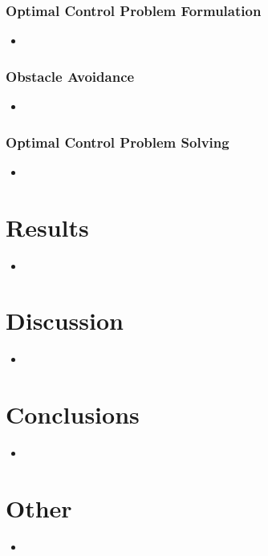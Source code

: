 \documentclass{article}
\begin{document}
\subsubsection{Optimal Control Problem Formulation}

\begin{itemize}
    \item 
\end{itemize}

\subsubsection{Obstacle Avoidance}

\begin{itemize}
    \item 
\end{itemize}

\subsubsection{Optimal Control Problem Solving}

\begin{itemize}
    \item 
\end{itemize}

\section{Results}

\begin{itemize}
    \item 
\end{itemize}

\section{Discussion}

\begin{itemize}
    \item 
\end{itemize}

\section{Conclusions}

\begin{itemize}
    \item 
\end{itemize}

\section{Other}

\begin{itemize}
    \item 
\end{itemize}
\end{document}
